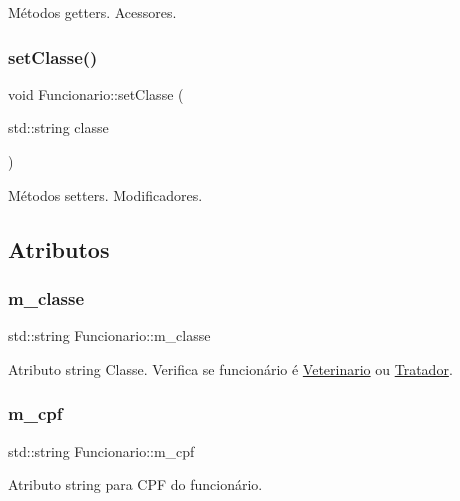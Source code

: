 Métodos getters. Acessores. \mbox{\label{classFuncionario_a1e05d112b5e3068dbeeba284d97b6b81}} 
\subsubsection{\texorpdfstring{set\+Classe()}{setClasse()}}
{\footnotesize\ttfamily void Funcionario\+::set\+Classe (\begin{DoxyParamCaption}\item[{std\+::string}]{classe }\end{DoxyParamCaption})}

Métodos setters. Modificadores. 

\subsection{Atributos}
\mbox{\label{classFuncionario_a7777e5ac421a364e2694c909dd1fd4d1}} 
\subsubsection{\texorpdfstring{m\+\_\+classe}{m\_classe}}
{\footnotesize\ttfamily std\+::string Funcionario\+::m\+\_\+classe\hspace{0.3cm}{\ttfamily [protected]}}

Atributo string Classe. Verifica se funcionário é \hyperlink{classVeterinario}{Veterinario} ou \hyperlink{classTratador}{Tratador}. \mbox{\label{classFuncionario_a74bd5f4c71bfb42219f0cce2a72eeb47}} 
\subsubsection{\texorpdfstring{m\+\_\+cpf}{m\_cpf}}
{\footnotesize\ttfamily std\+::string Funcionario\+::m\+\_\+cpf\hspace{0.3cm}{\ttfamily [protected]}}

Atributo string para C\+PF do funcionário. \mbox{\label{classFuncionario_ac9ccf61efca75f4130e79ef06b7278a2}} 
